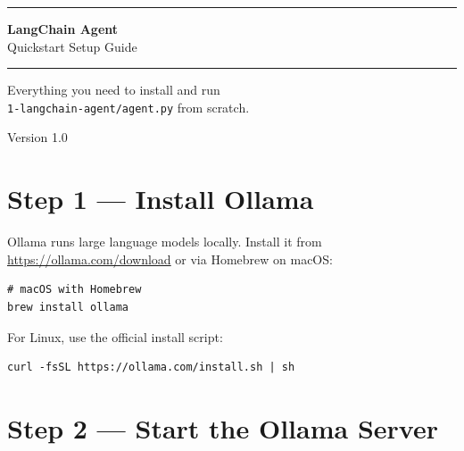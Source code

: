 \documentclass[12pt, a4paper]{article}
\begin{document}
\begin{titlepage}
  \centering
  \vspace*{3cm}
  {\color{primary}\rule{\linewidth}{2pt}}
  \vspace{1cm}

  {\Huge\bfseries\color{darktext} LangChain Agent}\\[0.5em]
  {\Large\color{mutedtext} Quickstart Setup Guide}

  \vspace{1cm}
  {\color{primary}\rule{\linewidth}{2pt}}

  \vspace{2cm}
  {\large\color{mutedtext}
    Everything you need to install and run\\
    \texttt{1-langchain-agent/agent.py} from scratch.
  }

  \vfill
  {\small\color{mutedtext} Version 1.0}
\end{titlepage}

\tableofcontents
\newpage

\section{Step 1 — Install Ollama}

Ollama runs large language models locally. Install it from \url{https://ollama.com/download} or via Homebrew on macOS:

\begin{lstlisting}[style=shellstyle]
# macOS with Homebrew
brew install ollama
\end{lstlisting}

For Linux, use the official install script:

\begin{lstlisting}[style=shellstyle]
curl -fsSL https://ollama.com/install.sh | sh
\end{lstlisting}

\section{Step 2 — Start the Ollama Server}
\end{document}
